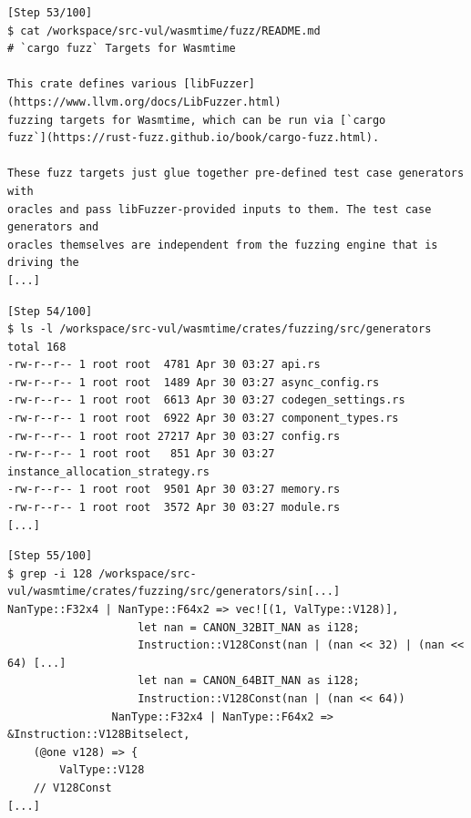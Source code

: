 \begin{tcolorbox}[enhanced,title={Example of \texttt{grep}/\texttt{ls}/\texttt{find} attempts}]



\begin{verbatim}
[Step 53/100]
$ cat /workspace/src-vul/wasmtime/fuzz/README.md
# `cargo fuzz` Targets for Wasmtime

This crate defines various [libFuzzer](https://www.llvm.org/docs/LibFuzzer.html)
fuzzing targets for Wasmtime, which can be run via [`cargo
fuzz`](https://rust-fuzz.github.io/book/cargo-fuzz.html).

These fuzz targets just glue together pre-defined test case generators with
oracles and pass libFuzzer-provided inputs to them. The test case generators and
oracles themselves are independent from the fuzzing engine that is driving the
[...]
\end{verbatim}

\begin{verbatim}
[Step 54/100]
$ ls -l /workspace/src-vul/wasmtime/crates/fuzzing/src/generators
total 168
-rw-r--r-- 1 root root  4781 Apr 30 03:27 api.rs
-rw-r--r-- 1 root root  1489 Apr 30 03:27 async_config.rs
-rw-r--r-- 1 root root  6613 Apr 30 03:27 codegen_settings.rs
-rw-r--r-- 1 root root  6922 Apr 30 03:27 component_types.rs
-rw-r--r-- 1 root root 27217 Apr 30 03:27 config.rs
-rw-r--r-- 1 root root   851 Apr 30 03:27 instance_allocation_strategy.rs
-rw-r--r-- 1 root root  9501 Apr 30 03:27 memory.rs
-rw-r--r-- 1 root root  3572 Apr 30 03:27 module.rs
[...]
\end{verbatim}

\begin{verbatim}
[Step 55/100]
$ grep -i 128 /workspace/src-vul/wasmtime/crates/fuzzing/src/generators/sin[...]
NanType::F32x4 | NanType::F64x2 => vec![(1, ValType::V128)],
                    let nan = CANON_32BIT_NAN as i128;
                    Instruction::V128Const(nan | (nan << 32) | (nan << 64) [...]
                    let nan = CANON_64BIT_NAN as i128;
                    Instruction::V128Const(nan | (nan << 64))
                NanType::F32x4 | NanType::F64x2 => &Instruction::V128Bitselect,
    (@one v128) => {
        ValType::V128
    // V128Const
[...]
\end{verbatim}


\end{tcolorbox}
